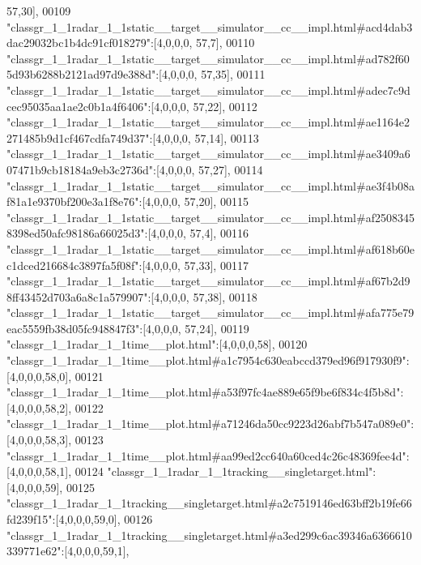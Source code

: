 \begin{DoxyCode}
      57,30],
00109 \textcolor{stringliteral}{"classgr\_1\_1radar\_1\_1static\_\_target\_\_simulator\_\_cc\_\_impl.html#acd4dab3dac29032bc1b4dc91cf018279"}:[4,0,0,0,
      57,7],
00110 \textcolor{stringliteral}{"classgr\_1\_1radar\_1\_1static\_\_target\_\_simulator\_\_cc\_\_impl.html#ad782f605d93b6288b2121ad97d9e388d"}:[4,0,0,0,
      57,35],
00111 \textcolor{stringliteral}{"classgr\_1\_1radar\_1\_1static\_\_target\_\_simulator\_\_cc\_\_impl.html#adec7c9dcec95035aa1ae2c0b1a4f6406"}:[4,0,0,0,
      57,22],
00112 \textcolor{stringliteral}{"classgr\_1\_1radar\_1\_1static\_\_target\_\_simulator\_\_cc\_\_impl.html#ae1164e2271485b9d1cf467cdfa749d37"}:[4,0,0,0,
      57,14],
00113 \textcolor{stringliteral}{"classgr\_1\_1radar\_1\_1static\_\_target\_\_simulator\_\_cc\_\_impl.html#ae3409a607471b9cb18184a9eb3c2736d"}:[4,0,0,0,
      57,27],
00114 \textcolor{stringliteral}{"classgr\_1\_1radar\_1\_1static\_\_target\_\_simulator\_\_cc\_\_impl.html#ae3f4b08af81a1e9370bf200e3a1f8e76"}:[4,0,0,0,
      57,20],
00115 \textcolor{stringliteral}{"classgr\_1\_1radar\_1\_1static\_\_target\_\_simulator\_\_cc\_\_impl.html#af25083458398ed50afc98186a66025d3"}:[4,0,0,0,
      57,4],
00116 \textcolor{stringliteral}{"classgr\_1\_1radar\_1\_1static\_\_target\_\_simulator\_\_cc\_\_impl.html#af618b60ec1dced216684c3897fa5f08f"}:[4,0,0,0,
      57,33],
00117 \textcolor{stringliteral}{"classgr\_1\_1radar\_1\_1static\_\_target\_\_simulator\_\_cc\_\_impl.html#af67b2d98ff43452d703a6a8c1a579907"}:[4,0,0,0,
      57,38],
00118 \textcolor{stringliteral}{"classgr\_1\_1radar\_1\_1static\_\_target\_\_simulator\_\_cc\_\_impl.html#afa775e79eac5559fb38d05fc948847f3"}:[4,0,0,0,
      57,24],
00119 \textcolor{stringliteral}{"classgr\_1\_1radar\_1\_1time\_\_plot.html"}:[4,0,0,0,58],
00120 \textcolor{stringliteral}{"classgr\_1\_1radar\_1\_1time\_\_plot.html#a1c7954c630eabccd379ed96f917930f9"}:[4,0,0,0,58,0],
00121 \textcolor{stringliteral}{"classgr\_1\_1radar\_1\_1time\_\_plot.html#a53f97fc4ae889e65f9be6f834c4f5b8d"}:[4,0,0,0,58,2],
00122 \textcolor{stringliteral}{"classgr\_1\_1radar\_1\_1time\_\_plot.html#a71246da50cc9223d26abf7b547a089e0"}:[4,0,0,0,58,3],
00123 \textcolor{stringliteral}{"classgr\_1\_1radar\_1\_1time\_\_plot.html#aa99ed2cc640a60ced4c26c48369fee4d"}:[4,0,0,0,58,1],
00124 \textcolor{stringliteral}{"classgr\_1\_1radar\_1\_1tracking\_\_singletarget.html"}:[4,0,0,0,59],
00125 \textcolor{stringliteral}{"classgr\_1\_1radar\_1\_1tracking\_\_singletarget.html#a2c7519146ed63bff2b19fe66fd239f15"}:[4,0,0,0,59,0],
00126 \textcolor{stringliteral}{"classgr\_1\_1radar\_1\_1tracking\_\_singletarget.html#a3ed299c6ac39346a6366610339771e62"}:[4,0,0,0,59,1],

\end{DoxyCode}
